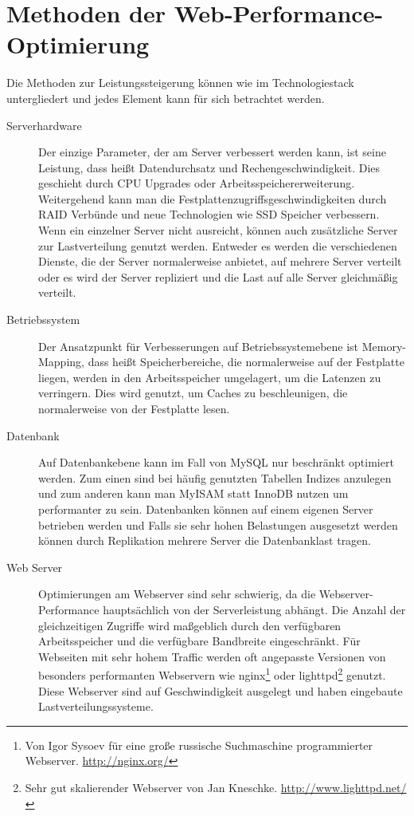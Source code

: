 
\section{Methoden der Web-Performance-Optimierung}
Die Methoden zur Leistungssteigerung können wie im Technologiestack untergliedert und jedes Element kann für sich betrachtet werden.

\begin{description}
  \item[Serverhardware] Der einzige Parameter, der am Server verbessert werden kann, ist seine Leistung, dass heißt Datendurchsatz und Rechengeschwindigkeit. Dies geschieht durch CPU Upgrades oder Arbeitsspeichererweiterung. Weitergehend kann man die Festplattenzugriffsgeschwindigkeiten durch RAID Verbünde und neue Technologien wie SSD Speicher verbessern. Wenn ein einzelner Server nicht ausreicht, k\"onnen auch zus\"atzliche Server zur Lastverteilung genutzt werden. Entweder es werden die verschiedenen Dienste, die der Server normalerweise anbietet, auf mehrere Server verteilt oder es wird der Server repliziert und die Last auf alle Server gleichm\"a\ss{}ig verteilt.
  \item[Betriebssystem] Der Ansatzpunkt für Verbesserungen auf Betriebssystemebene ist Memory-Mapping, dass heißt Speicherbereiche, die normalerweise auf der Festplatte liegen, werden in den Arbeitsspeicher umgelagert, um die Latenzen zu verringern. Dies wird genutzt, um Caches zu beschleunigen, die normalerweise von der Festplatte lesen.
  \item[Datenbank] Auf Datenbankebene kann im Fall von MySQL nur beschränkt optimiert werden. Zum einen sind bei häufig genutzten Tabellen Indizes anzulegen und zum anderen kann man MyISAM statt InnoDB nutzen um performanter zu sein. Datenbanken k\"onnen auf einem eigenen Server betrieben werden und Falls sie sehr hohen Belastungen ausgesetzt werden k\"onnen durch Replikation mehrere Server die Datenbanklast tragen.
  \item[Web Server] Optimierungen am Webserver sind sehr schwierig, da die Webserver-Performance hauptsächlich von der Serverleistung abhängt. Die Anzahl der gleichzeitigen Zugriffe wird maßgeblich durch den verfügbaren Arbeitsspeicher und die verfügbare Bandbreite eingeschränkt. F\"ur Webseiten mit sehr hohem Traffic werden oft angepasste Versionen von besonders performanten Webservern wie nginx\footnote{Von Igor Sysoev f\"ur eine gro\ss{}e russische Suchmaschine programmierter Webserver. \url{http://nginx.org/}} oder lighttpd\footnote{Sehr gut skalierender Webserver von Jan Kneschke. \url{http://www.lighttpd.net/}} genutzt. Diese Webserver sind auf Geschwindigkeit ausgelegt und haben eingebaute Lastverteilungssysteme.

\end{description}
